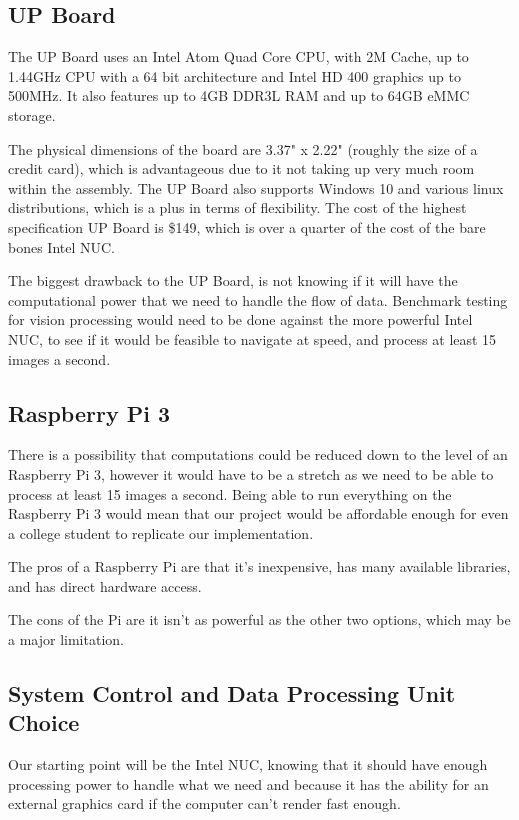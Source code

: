 \documentclass[compsoc,draftclsnofoot,onecolumn,10pt]{IEEEtran}
\begin{document}
\subsection{UP Board}
The UP Board uses an Intel Atom Quad Core CPU, with 2M Cache, up to 1.44GHz CPU with a 64 bit architecture and Intel HD 400 graphics up to 500MHz. 
It also features up to 4GB DDR3L RAM and up to 64GB eMMC storage. \par
The physical dimensions of the board are 3.37" x 2.22" (roughly the size of a credit card), which is advantageous due to it not taking up very much room within the assembly. 
The UP Board also supports Windows 10 and various linux distributions, which is a plus in terms of flexibility. 
The cost of the highest specification UP Board is \$149, which is over a quarter of the cost of the bare bones Intel NUC. \par
The biggest drawback to the UP Board, is not knowing if it will have the computational power that we need to handle the flow of data. 
Benchmark testing for vision processing would need to be done against the more powerful Intel NUC, to see if it would be feasible to navigate at speed, and process at least 15 images a second. 

\subsection{Raspberry Pi 3}
There is a possibility that  computations could be reduced down to the level of an Raspberry Pi 3, however it would have to be a stretch as we need to be able to process at least 15 images a second. 
Being able to run everything on the Raspberry Pi 3 would mean that our project would be affordable enough for even a college student to replicate our implementation. \par
The pros of a Raspberry Pi are that it's inexpensive, has many available libraries, and has direct hardware access. \par
The cons of the Pi are it isn't as powerful as the other two options, which may be a major limitation. 

\subsection{System Control and Data Processing Unit Choice}
Our starting point will be the Intel NUC, knowing that it should have enough processing power to handle what we need and because it has the ability for an external graphics card if the computer can't render fast enough. 
\end{document}

